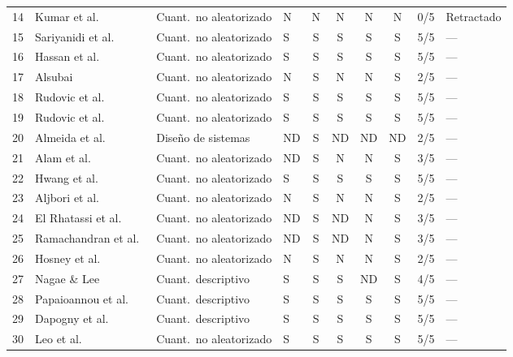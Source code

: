 \documentclass[ASNA,twocolumn]{USG}
\begin{document}
\begin{table}[!ht]
{\begin{tabular*}{\textwidth}{@{\extracolsep\fill}clllcccccl@{\extracolsep\fill}}
				14 & Kumar et al.\ \cite{Kumar2024}               & Cuant.\ no aleatorizado & N  & N  & N  & N  & N  & 0/5 & Retractado \\
				15 & Sariyanidi et al.\ \cite{Sariyanidi2025}     & Cuant.\ no aleatorizado & S  & S  & S  & S  & S  & 5/5 & --- \\
				16 & Hassan et al.\ \cite{Hassan2025}             & Cuant.\ no aleatorizado & S  & S  & S  & S  & S  & 5/5 & --- \\
				17 & Alsubai \cite{Alsubai2025}                   & Cuant.\ no aleatorizado & N  & S  & N  & N  & S  & 2/5 & --- \\
				18 & Rudovic et al.\ \cite{Rudovic2018}           & Cuant.\ no aleatorizado & S  & S  & S  & S  & S  & 5/5 & --- \\
				19 & Rudovic et al.\ \cite{Rudovic2019}           & Cuant.\ no aleatorizado & S  & S  & S  & S  & S  & 5/5 & --- \\
				20 & Almeida et al.\ \cite{Almeida2019}           & Diseño de sistemas      & ND & S  & ND & ND & ND & 2/5 & --- \\
				21 & Alam et al.\ \cite{Alam2025}                 & Cuant.\ no aleatorizado & ND & S  & N  & N  & S  & 3/5 & --- \\
				22 & Hwang et al.\ \cite{Hwang2024}               & Cuant.\ no aleatorizado & S  & S  & S  & S  & S  & 5/5 & --- \\
				23 & Aljbori et al.\ \cite{Aljbori2025}           & Cuant.\ no aleatorizado & N  & S  & N  & N  & S  & 2/5 & --- \\
				24 & El Rhatassi et al.\ \cite{Rhatassi2025}    & Cuant.\ no aleatorizado & ND & S  & ND & N  & S  & 3/5 & --- \\
				25 & Ramachandran et al.\ \cite{Ramachandran2025} & Cuant.\ no aleatorizado & ND & S  & ND & N  & S  & 3/5 & --- \\
				26 & Hosney et al.\ \cite{Hosney2024}             & Cuant.\ no aleatorizado & N  & S  & N  & N  & S  & 2/5 & --- \\
				27 & Nagae \& Lee \cite{Nagae2022}                & Cuant.\ descriptivo     & S  & S  & S  & ND & S  & 4/5 & --- \\
				28 & Papaioannou et al.\ \cite{Papaioannou2021}   & Cuant.\ descriptivo     & S  & S  & S  & S  & S  & 5/5 & --- \\
				29 & Dapogny et al.\ \cite{Dapogny2019}          & Cuant.\ descriptivo     & S  & S  & S  & S  & S  & 5/5 & --- \\
				30 & Leo et al.\ \cite{Leo2018}                   & Cuant.\ no aleatorizado & S  & S  & S  & S  & S  & 5/5 & --- \\

\end{tabular*}}
\end{table}
\end{document}
